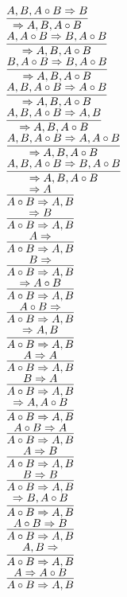 \documentclass[11pt]{article}
\begin{document}
\begin{center}
\bigskip
\\$\infer{\Rightarrow A, B, A\circ B}{A, B, A\circ B\Rightarrow B}$
\bigskip
\\$\infer{\Rightarrow A, B, A\circ B}{A, A\circ B\Rightarrow B, A\circ B}$
\bigskip
\\$\infer{\Rightarrow A, B, A\circ B}{B, A\circ B\Rightarrow B, A\circ B}$
\bigskip
\\$\infer{\Rightarrow A, B, A\circ B}{A, B, A\circ B\Rightarrow A\circ B}$
\bigskip
\\$\infer{\Rightarrow A, B, A\circ B}{A, B, A\circ B\Rightarrow A, B}$
\bigskip
\\$\infer{\Rightarrow A, B, A\circ B}{A, B, A\circ B\Rightarrow A, A\circ B}$
\bigskip
\\$\infer{\Rightarrow A, B, A\circ B}{A, B, A\circ B\Rightarrow B, A\circ B}$
\bigskip
\\$\infer{A\circ B\Rightarrow A, B}{\Rightarrow A}$
\bigskip
\\$\infer{A\circ B\Rightarrow A, B}{\Rightarrow B}$
\bigskip
\\$\infer{A\circ B\Rightarrow A, B}{A\Rightarrow }$
\bigskip
\\$\infer{A\circ B\Rightarrow A, B}{B\Rightarrow }$
\bigskip
\\$\infer{A\circ B\Rightarrow A, B}{\Rightarrow A\circ B}$
\bigskip
\\$\infer{A\circ B\Rightarrow A, B}{A\circ B\Rightarrow }$
\bigskip
\\$\infer{A\circ B\Rightarrow A, B}{\Rightarrow A, B}$
\bigskip
\\$\infer{A\circ B\Rightarrow A, B}{A\Rightarrow A}$
\bigskip
\\$\infer{A\circ B\Rightarrow A, B}{B\Rightarrow A}$
\bigskip
\\$\infer{A\circ B\Rightarrow A, B}{\Rightarrow A, A\circ B}$
\bigskip
\\$\infer{A\circ B\Rightarrow A, B}{A\circ B\Rightarrow A}$
\bigskip
\\$\infer{A\circ B\Rightarrow A, B}{A\Rightarrow B}$
\bigskip
\\$\infer{A\circ B\Rightarrow A, B}{B\Rightarrow B}$
\bigskip
\\$\infer{A\circ B\Rightarrow A, B}{\Rightarrow B, A\circ B}$
\bigskip
\\$\infer{A\circ B\Rightarrow A, B}{A\circ B\Rightarrow B}$
\bigskip
\\$\infer{A\circ B\Rightarrow A, B}{A, B\Rightarrow }$
\bigskip
\\$\infer{A\circ B\Rightarrow A, B}{A\Rightarrow A\circ B}$

\end{center}
\end{document}
